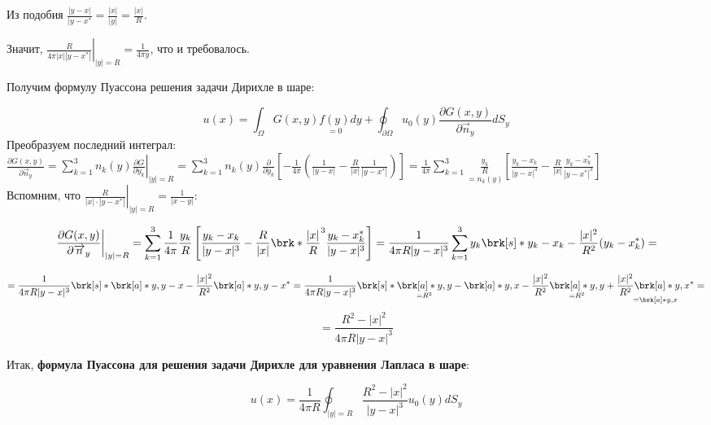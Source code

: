 Из подобия $\frac{|y-x|}{|y-x^*} = \frac{|x|}{|y|} = \frac{|x|}{R}$.

Значит, $\left.\frac{R}{4 \pi |x| |y-x^*|} \right|_{|y|=R} = \frac{1}{4 \pi y}$, что и требовалось.


Получим формулу Пуассона решения задачи Дирихле в шаре:

$$u(x) = \int_{\Omega}{G(x,y) \underset{=0}{f(y)} dy} +
\oint_{\partial \Omega}{u_0(y) \frac{\partial G(x,y)}
{\partial \overrightarrow{n}_y}dS_y}
$$
Преобразуем последний интеграл:\\

$
\frac{\partial G(x,y)}{\partial \overrightarrow{n}_y}=
\sum_{k=1}^{3}{n_k(y) \left. \frac{\partial G}{\partial y_k} \right|_{|y|=R}}=
\sum_{k=1}^{3}{n_k(y)\frac{\partial}{\partial y_k}\left[
-\frac{1}{4\pi}\left(\frac{1}{|y-x|}-\frac{R}{|x|}\frac{1}{|y-x^*|}\right)
\right]} 
=
\frac{1}{4 \pi}  \sum_{k=1}^{3}\underset{=n_k(y)}{\frac{y_k}{R}}\left[ \frac{y_k-x_k}{|y-x|^3} - \frac{R}{|x|}  \frac{y_k-x_k^*}{|y-x^*|^3} \right]
$\\

Вспомним, что $\left.\frac{R}{|x|\cdot|y-x^*|}\right|_{|y|=R} =
\frac{1}{|x-y|}$:

$$
\left. \frac{\partial G(x,y)}{\partial \overrightarrow{n}_y} \right|_{|y|=R} 
=
\sum_{k=1}^{3}{\frac{1}{4 \pi} \frac{y_k}{R}
\left[ \frac{y_k-x_k}{|y-x|^3} -\frac{R}{|x|}\brk*{\frac{|x|}{R}}^3
\frac{y_k - x_k^*}{|y-x|^3} \right] }
=
\frac{1}{4 \pi R |y-x|^3} \sum_{k=1}^{3}{y_k \brk[s]*{y_k-x_k-\frac{|x|^2}{R^2}(y_k - x_k^*)}}
=
$$

$$
=
\frac{1}{4 \pi R |y-x|^3} \brk[s]*{\brk[a]*{y,y-x} - \frac{|x|^2}{R^2}
\brk[a]*{y,y-x^*}}
=
\frac{1}{4 \pi R |y-x|^3} \brk[s]*{\underset{=R^2}{\brk[a]*{y,y}} - \brk[a]*{y,x}
-\frac{|x|^2}{R^2}\underset{=R^2}{\brk[a]*{y,y}}+ \underset{=\brk[a]*{y,x}}{\frac{|x|^2}{R^2} \brk[a]*{y,x^*}}  }
= $$ 
$$
=\frac{R^2 - |x|^2}{4 \pi R |y-x|^3}
$$

Итак, \textbf{формула Пуассона для решения задачи Дирихле для уравнения Лапласа в шаре}:

$$
u(x) = \frac{1}{4 \pi R} \oint_{|y|=R}{\frac{R^2-|x|^2}{|y-x|^3}u_0(y) dS_y}
$$



